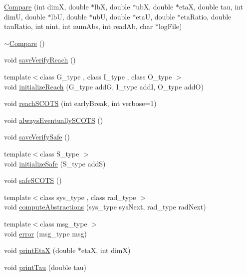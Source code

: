 \begin{DoxyCompactItemize}
\item 
\hyperlink{classscots_1_1Compare_a41fa2b26a7292b46edd3dfc7a6f8c5ee}{Compare} (int dimX, double $\ast$lbX, double $\ast$ubX, double $\ast$etaX, double tau, int dimU, double $\ast$lbU, double $\ast$ubU, double $\ast$etaU, double $\ast$eta\+Ratio, double tau\+Ratio, int nint, int num\+Abs, int read\+Ab, char $\ast$log\+File)
\item 
\hyperlink{classscots_1_1Compare_abcd6b6626afb98b977a1c9d64ef438f2}{$\sim$\+Compare} ()
\item 
void \hyperlink{classscots_1_1Compare_aa96846be5c881576f5add5ce32f7fe8a}{save\+Verify\+Reach} ()
\item 
{\footnotesize template$<$class G\+\_\+type , class I\+\_\+type , class O\+\_\+type $>$ }\\void \hyperlink{classscots_1_1Compare_a4cb70ea51bb4778d92bd134c3b2ffc5e}{initialize\+Reach} (G\+\_\+type addG, I\+\_\+type addI, O\+\_\+type addO)
\item 
void \hyperlink{classscots_1_1Compare_a506b87a62b1adde561d725e9cc1315e9}{reach\+S\+C\+O\+TS} (int early\+Break, int verbose=1)
\item 
void \hyperlink{classscots_1_1Compare_afbc28a076ac3c620d4eae4b8af905877}{always\+Eventually\+S\+C\+O\+TS} ()
\item 
void \hyperlink{classscots_1_1Compare_a9e79295cd6f8c7eed65d29ca2667cff9}{save\+Verify\+Safe} ()
\item 
{\footnotesize template$<$class S\+\_\+type $>$ }\\void \hyperlink{classscots_1_1Compare_aec4ea9d5132711c734141bd9ed060752}{initialize\+Safe} (S\+\_\+type addS)
\item 
void \hyperlink{classscots_1_1Compare_ad54d4ddd0268b4a41e53f19d668ab8b0}{safe\+S\+C\+O\+TS} ()
\item 
{\footnotesize template$<$class sys\+\_\+type , class rad\+\_\+type $>$ }\\void \hyperlink{classscots_1_1Compare_a3bdf985c18d37edf8ee63ea00f6b2635}{compute\+Abstractions} (sys\+\_\+type sys\+Next, rad\+\_\+type rad\+Next)
\item 
{\footnotesize template$<$class msg\+\_\+type $>$ }\\void \hyperlink{classscots_1_1Compare_ae694b20dbe9ceb8db5f80508e7c65488}{error} (msg\+\_\+type msg)
\item 
void \hyperlink{classscots_1_1Compare_a4ed25bd656e43ea3693266843edb88d2}{print\+EtaX} (double $\ast$etaX, int dimX)
\item 
void \hyperlink{classscots_1_1Compare_a9f062bcfa755da8ba004045cb9605ab5}{print\+Tau} (double tau)
\end{DoxyCompactItemize}
